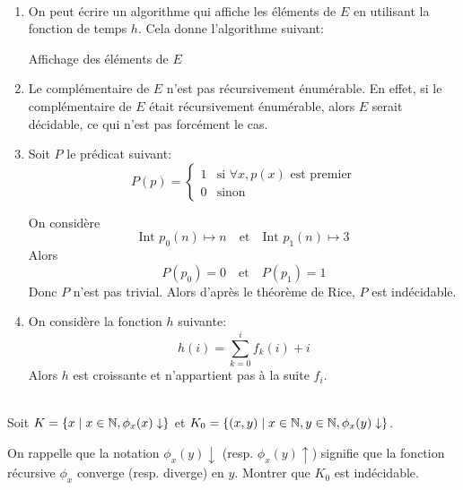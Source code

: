 \documentclass[french,a4paper,10pt]{article}
\begin{document}
    \begin{td-sol}\,
        \begin{enumerate}
            \item On peut écrire un algorithme qui affiche les éléments de $E$ en utilisant la
            fonction de temps $h$. Cela donne l'algorithme suivant:\\
                \begin{algorithm}[H]
                    \caption{Affichage des éléments de $E$}
                \end{algorithm}
            \item Le complémentaire de $E$ n'est pas récursivement énumérable. 
            En effet, si le complémentaire de $E$ était récursivement énumérable, 
            alors $E$ serait décidable, ce qui n'est pas forcément le cas.
            \item Soit $P$ le prédicat suivant:
            \[
                P(p) = \begin{cases}
                    1& \text{si }\forall x, p(x) \text{ est premier}\\
                    0 & \text{sinon}
                \end{cases}
            \]

            On considère
            \[
                \text{Int } p_0(n) \mapsto n \quad \text{et} \quad \text{Int } p_1(n) \mapsto 3
            \]
            Alors
            \[
                P(p_0) = 0 \quad \text{et} \quad P(p_1) = 1
            \]
            Donc $P$ n'est pas trivial.
            Alors d'après le théorème de Rice, $P$ est indécidable.


            \item On considère la fonction $h$ suivante:
            \[
                h(i)=\sum_{k=0}^i f_k(i)+i
            \]
            Alors $h$ est croissante et n'appartient pas à la suite $f_i$.
        \end{enumerate}
    \end{td-sol}

    \begin{td-exo}[4 - Réduction en $K$ et $K_0$]\,\\
        Soit $K = \{x\mid x\in \mathbb{N},\phi_x(x)\downarrow\}$ et $K_0 = \{(x,y)\mid x\in \mathbb{N}, y\in \mathbb{N}, \phi_x(y)\downarrow\}$.
        
        On rappelle que la notation $\phi_x(y)\downarrow$ (resp. $\phi_x(y)\uparrow$) signifie que la fonction 
        récursive $\phi_x$ converge (resp. diverge) en $y$.
        Montrer que $K_0$ est indécidable.
    \end{td-exo}
\end{document}
